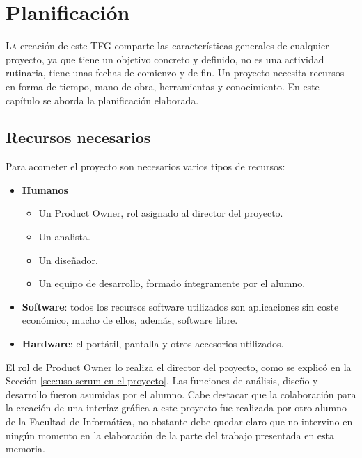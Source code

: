 
\chapter{Planificación}
\label{chap:planificación}

\lettrine{L}{a} creación de este TFG comparte las características generales de cualquier proyecto, ya que tiene un objetivo concreto y definido, no es una actividad rutinaria, tiene unas fechas de comienzo y de fin. Un proyecto necesita recursos en forma de tiempo, mano de obra, herramientas y conocimiento. En este capítulo se aborda la planificación elaborada.

\section{Recursos necesarios}

Para acometer el proyecto son necesarios varios tipos de recursos:

\begin{itemize}
    \item \textbf{Humanos}
        \begin{itemize}
            \item Un Product Owner, rol asignado al director del proyecto.
            \item Un analista.
            \item Un diseñador.
            \item Un equipo de desarrollo, formado íntegramente por el alumno.
        \end{itemize}
    \item \textbf{Software}: todos los recursos software utilizados son aplicaciones sin coste económico, mucho de ellos, además, software libre.
    \item \textbf{Hardware}: el portátil, pantalla y otros accesorios utilizados.
\end{itemize}

El rol de Product Owner lo realiza el director del proyecto, como se explicó en la Sección \ref{sec:uso-scrum-en-el-proyecto}. Las funciones de análisis, diseño y desarrollo fueron asumidas por el alumno. Cabe destacar que la colaboración para la creación de una interfaz gráfica a este proyecto fue realizada por otro alumno de la Facultad de Informática, no obstante debe quedar claro que no intervino en ningún momento en la elaboración de la parte del trabajo presentada en esta memoria.

